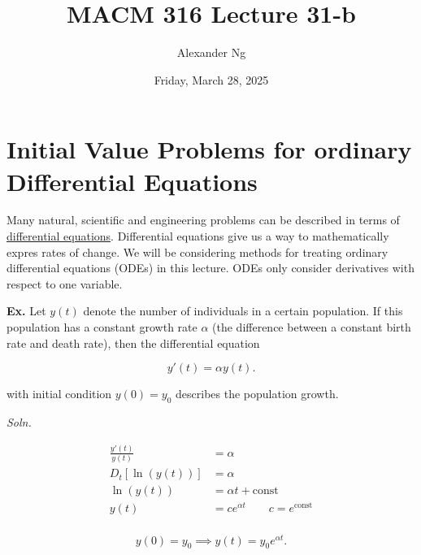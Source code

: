 \documentclass[12pt]{article}
\newcommand{\Ex}{\textbf{Ex.}\xspace}
\newcommand{\soln}{\textit{Soln.}\xspace}
\begin{document}
\title{MACM 316 Lecture 31-b}
\author{Alexander Ng}
\date{Friday, March 28, 2025}

\maketitle

\section{Initial Value Problems for ordinary Differential Equations}

Many natural, scientific and engineering problems can be described in terms of 
\uline{differential equations}. Differential equations give us a way to
mathematically expres rates of change. We will be considering methods for
treating ordinary differential equations (ODEs) in this lecture. ODEs only
consider derivatives with respect to one variable.

\Ex Let $y(t)$ denote the number of individuals in a certain population. If this
population has a constant growth rate $\alpha$ (the difference between a
constant birth rate and death rate), then the differential equation 

\[
y'(t) = \alpha y(t)
.\]

with initial condition $y(0) = y_0$ describes the population growth.

\soln 


\begin{align*}
  \frac{y'(t)}{y(t)} &= \alpha \\
  D_t[\ln(y(t))] &= \alpha \\
  \ln(y(t)) &= \alpha t + \text{const}  \\
  y(t) &= ce^{\alpha t} \qquad c = e^{\text{const}}\\
\end{align*}

\begin{equation*}
  y(0) = y_0 \implies y(t) = y_0 e^{\alpha t}
.\end{equation*}
\end{document}
